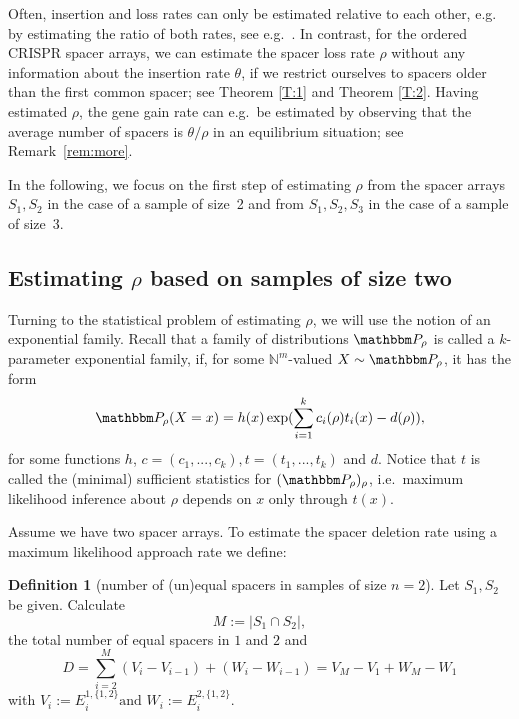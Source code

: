 \documentclass[preprint,authoryear]{elsarticle}
\theoremstyle{definition}
\newtheorem{definition}[proposition]{Definition}
\numberwithin{equation}{section}
\numberwithin{figure}{section}
\begin{document}
Often, insertion and loss rates can only be estimated relative to each
other, e.g. by estimating the ratio of both rates, see e.g.\
\cite{BaumdickerPfaffelhuberHess2012}. 
In contrast, for the ordered CRISPR spacer arrays, we can estimate the
spacer loss rate $\rho$ without any information about the insertion
rate $\theta$, if we restrict ourselves to spacers older than the
first common spacer; see Theorem \ref{T:1} and Theorem \ref{T:2}.
Having estimated $\rho$, the gene gain rate can e.g.\ be estimated by
observing that the average number of spacers is $\theta/\rho$ in an
equilibrium situation; see Remark~\ref{rem:more}.

In the following, we focus on the first step of estimating $\rho$ from
the spacer arrays $S_{\mathfrak 1}, S_{\mathfrak 2}$ in the case of a
sample of size~2 and from
$S_{\mathfrak 1}, S_{\mathfrak 2}, S_{\mathfrak 3}$ in the case of a
sample of size~3.

\subsection{Estimating $\rho$ based on samples of size two}
\noindent
Turning to the statistical problem of estimating $\rho$, we will use
the notion of an exponential family. Recall that a family of
distributions $\mathbbm P_\rho$ is called a $k$-parameter exponential family,
if, for some $\mathbb N^m$-valued $X \sim \mathbbm P_\rho$, it has the
form
$$ \mathbbm P_\rho(X = x) = h(x) \exp(\sum\limits_{i = 1}^k  c_i(\rho) t_i(x) - d(\rho)),$$
for some functions $h$, $c = (c_1,...,c_k), t = (t_1,...,t_k)$ and
$d$. Notice that $t$ is called the (minimal) sufficient statistics for
$(\mathbbm P_\rho)_\rho$, i.e.\ maximum likelihood inference about
$\rho$ depends on $x$ only through $t(x)$.

Assume we have two spacer arrays. To estimate the spacer
deletion rate using a maximum likelihood approach rate we define:

\begin{definition}[number of (un)equal spacers in samples of size
  $n=2$]\label{alg:1}%
  Let $S_{\mathfrak 1},S_{\mathfrak 2}$ %
  be given. Calculate
  $$ M := |S_{\mathfrak 1} \cap S_{\mathfrak 2}|,$$
  the total number of equal spacers in $\mathfrak 1$ and $\mathfrak 2$
  and
  $$D = \sum_{i=2}^M (V_i-V_{i-1}) + (W_i - W_{i-1}) = V_M - V_1 + W_M-W_1 $$
  with
$
    V_i  := E_{i}^{\mathfrak 1, \{\mathfrak 1, \mathfrak 2\}} \text{and }%
    W_i := E_{i}^{\mathfrak 2, \{\mathfrak 1, \mathfrak 2\}}.
$
  
  
\end{definition}
\end{document}
